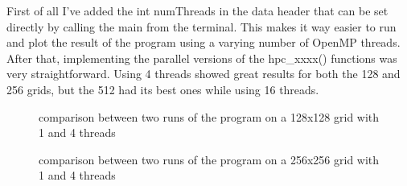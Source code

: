 \documentclass[unicode,11pt,a4paper,oneside,numbers=endperiod,openany]{scrartcl}
\begin{document}
First of all I've added the int numThreads in the data header that can be set directly by calling the main from the terminal. This makes it way easier to run and plot the result of the program using a varying number of OpenMP threads.
\newline
After that, implementing the parallel versions of the hpc\_xxxx() functions was very straightforward. 
\newline
\newline
Using 4 threads showed great results for both the 128 and 256 grids, but the 512 had its best ones while using 16 threads.
\newline
\begin{figure}[H]
\centering
  \hfill
  \caption{comparison between two runs of the program on a 128x128 grid with 1 and 4 threads}
\end{figure}
\begin{figure}[H]
\centering
  \hfill
  \caption{comparison between two runs of the program on a 256x256 grid with 1 and 4 threads}
\end{figure}
\end{document}
